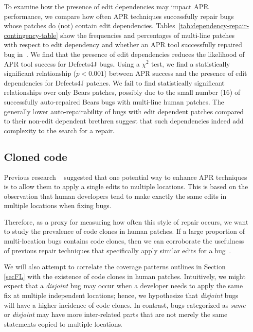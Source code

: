 \documentclass[sigconf, timestamp-false, anonymous=true]{acmart}
\begin{document}
To examine how the presence of edit dependencies may impact 
APR performance, we compare how often APR techniques 
successfully repair bugs whose patches do (not) contain edit dependencies.
Tables~\ref{tab:dependency-repair-contingency-table}
show the frequencies and percentages of multi-line patches with respect to edit dependency 
and whether an APR tool successfully repaired bug in~\cite{durieux-repair-them-all}.
We find that the presence of edit dependencies 
reduces the likelihood of APR tool success for Defects4J bugs.
Using a $\chi^2$ test, we find a statistically significant relationship ($p < 0.001$)
between APR success and the presence of edit dependencies for Defects4J patches. 
We fail to find statistically 
significant relationships over only Bears patches, possibly due to the small number (16) of 
successfully auto-repaired Bears bugs with multi-line human patches.
The generally lower auto-repairability of bugs with edit dependent patches compared 
to their non-edit dependent brethren suggest that such dependencies indeed 
add complexity to the search for a repair.

\subsection{Cloned code}


Previous research ~\cite{wang2018} suggested that one potential way to enhance
APR techniques is to allow them to apply a single edits to multiple locations.
This is based on the observation that human developers tend to make exactly the 
same edits in multiple locations when fixing bugs. 

Therefore, as a proxy for measuring how often this style of repair occurs, we want to study the
prevalence of code clones in human patches. If a large proportion of multi-location bugs contains code 
clones, then we can corroborate the usefulness of previous repair techniques that specifically apply 
similar 
edits for a bug~\cite{saha2019harnessing}.

We will also attempt to correlate the coverage patterns outlines in Section \ref{secFL} with the 
existence of 
code clones in 
human patches. Intuitively, we might expect that a \emph{disjoint} bug may occur when a developer 
needs 
to apply the same fix at multiple independent locations; hence, we hypothesize that \emph{disjoint} 
bugs 
will have a higher incidence of code clones. In contrast, bugs categorized as \emph{same} or 
\emph{disjoint} may have more inter-related parts that are not merely the same statements copied to 
multiple locations.
\end{document}
